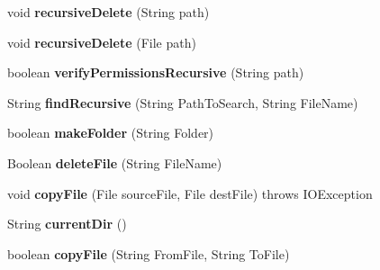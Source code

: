 \begin{DoxyCompactItemize}
\item 
\hypertarget{classCASUAL_1_1FileOperations_a8bf6613169e83dee9b70179e1331d99d}{void {\bfseries recursive\-Delete} (String path)}\label{classCASUAL_1_1FileOperations_a8bf6613169e83dee9b70179e1331d99d}

\item 
\hypertarget{classCASUAL_1_1FileOperations_a5fed83c75685ff9516eab0c37658070d}{void {\bfseries recursive\-Delete} (File path)}\label{classCASUAL_1_1FileOperations_a5fed83c75685ff9516eab0c37658070d}

\item 
\hypertarget{classCASUAL_1_1FileOperations_ae522f99e553aaa391e65a8c54ae60083}{boolean {\bfseries verify\-Permissions\-Recursive} (String path)}\label{classCASUAL_1_1FileOperations_ae522f99e553aaa391e65a8c54ae60083}

\item 
\hypertarget{classCASUAL_1_1FileOperations_afe29c51ef53af5e44cc4aa61a9a103d0}{String {\bfseries find\-Recursive} (String Path\-To\-Search, String File\-Name)}\label{classCASUAL_1_1FileOperations_afe29c51ef53af5e44cc4aa61a9a103d0}

\item 
\hypertarget{classCASUAL_1_1FileOperations_a2f6eced2a42e01ee23478f3a0448b139}{boolean {\bfseries make\-Folder} (String Folder)}\label{classCASUAL_1_1FileOperations_a2f6eced2a42e01ee23478f3a0448b139}

\item 
\hypertarget{classCASUAL_1_1FileOperations_a5b1172ca44af911f74d127cd05bf1f72}{Boolean {\bfseries delete\-File} (String File\-Name)}\label{classCASUAL_1_1FileOperations_a5b1172ca44af911f74d127cd05bf1f72}

\item 
\hypertarget{classCASUAL_1_1FileOperations_a95b6013a6610a12798b5a245a741196a}{void {\bfseries copy\-File} (File source\-File, File dest\-File)  throws I\-O\-Exception }\label{classCASUAL_1_1FileOperations_a95b6013a6610a12798b5a245a741196a}

\item 
\hypertarget{classCASUAL_1_1FileOperations_a6218a9a8ce1c18711d59b844417adc8a}{String {\bfseries current\-Dir} ()}\label{classCASUAL_1_1FileOperations_a6218a9a8ce1c18711d59b844417adc8a}

\item 
\hypertarget{classCASUAL_1_1FileOperations_a13967d313b6bd64f4449872f39cd9850}{boolean {\bfseries copy\-File} (String From\-File, String To\-File)}\label{classCASUAL_1_1FileOperations_a13967d313b6bd64f4449872f39cd9850}


\end{DoxyCompactItemize}
